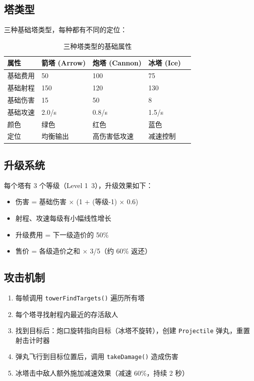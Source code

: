 \documentclass[12pt,a4paper]{ctexart}
\begin{document}
\subsection{塔类型}

三种基础塔类型，每种都有不同的定位：

\begin{table}[H]
    \centering
    \caption{三种塔类型的基础属性}
    \begin{tabularx}{\textwidth}{lXXXX}
        \toprule
        \textbf{属性} & \textbf{箭塔 (Arrow)} & \textbf{炮塔 (Cannon)} & \textbf{冰塔 (Ice)} \\
        \midrule
        基础费用   & 50   & 100  & 75   \\
        基础射程   & 150  & 120  & 130  \\
        基础伤害   & 15   & 50   & 8    \\
        基础攻速   & 2.0/s & 0.8/s & 1.5/s \\
        颜色       & 绿色  & 红色  & 蓝色  \\
        定位       & 均衡输出 & 高伤害低攻速 & 减速控制 \\
        \bottomrule
    \end{tabularx}
\end{table}

\subsection{升级系统}

每个塔有 3 个等级（Level 1~3），升级效果如下：

\begin{itemize}
    \item 伤害 = 基础伤害 × (1 + (等级-1) × 0.6)
    \item 射程、攻速每级有小幅线性增长
    \item 升级费用 = 下一级造价的 50\%
    \item 售价 = 各级造价之和 × 3/5（约 60\% 返还）
\end{itemize}

\subsection{攻击机制}

\begin{enumerate}
    \item 每帧调用 \texttt{towerFindTargets()} 遍历所有塔
    \item 每个塔寻找射程内最近的存活敌人
    \item 找到目标后：炮口旋转指向目标（冰塔不旋转），创建 \texttt{Projectile} 弹丸，重置射击计时器
    \item 弹丸飞行到目标位置后，调用 \texttt{takeDamage()} 造成伤害
    \item 冰塔击中敌人额外施加减速效果（减速 60\%，持续 2 秒）
\end{enumerate}
\end{document}
